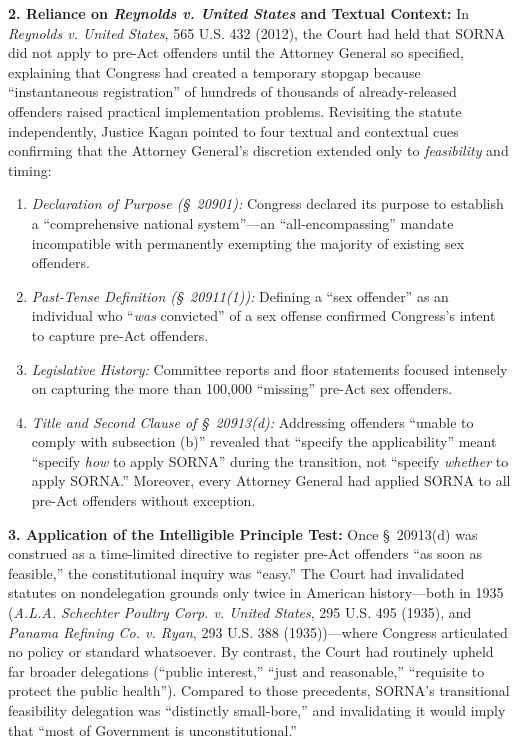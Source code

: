 \documentclass[12pt]{article}
\begin{document}
\textbf{2. Reliance on \textit{Reynolds v. United States} and Textual Context:} In \textit{Reynolds v. United States}, 565 U.S. 432 (2012), the Court had held that SORNA did not apply to pre-Act offenders until the Attorney General so specified, explaining that Congress had created a temporary stopgap because ``instantaneous registration'' of hundreds of thousands of already-released offenders raised practical implementation problems. Revisiting the statute independently, Justice Kagan pointed to four textual and contextual cues confirming that the Attorney General's discretion extended only to \textit{feasibility} and timing:
\begin{enumerate}
  \item \textit{Declaration of Purpose (\S~20901):} Congress declared its purpose to establish a ``comprehensive national system''---an ``all-encompassing'' mandate incompatible with permanently exempting the majority of existing sex offenders.
  \item \textit{Past-Tense Definition (\S~20911(1)):} Defining a ``sex offender'' as an individual who ``\textit{was} convicted'' of a sex offense confirmed Congress's intent to capture pre-Act offenders.
  \item \textit{Legislative History:} Committee reports and floor statements focused intensely on capturing the more than 100,000 ``missing'' pre-Act sex offenders.
  \item \textit{Title and Second Clause of \S~20913(d):} Addressing offenders ``unable to comply with subsection (b)'' revealed that ``specify the applicability'' meant ``specify \textit{how} to apply SORNA'' during the transition, not ``specify \textit{whether} to apply SORNA.'' Moreover, every Attorney General had applied SORNA to all pre-Act offenders without exception.
\end{enumerate}

\textbf{3. Application of the Intelligible Principle Test:} Once \S~20913(d) was construed as a time-limited directive to register pre-Act offenders ``as soon as feasible,'' the constitutional inquiry was ``easy.'' The Court had invalidated statutes on nondelegation grounds only twice in American history---both in 1935 (\textit{A.L.A. Schechter Poultry Corp. v. United States}, 295 U.S. 495 (1935), and \textit{Panama Refining Co. v. Ryan}, 293 U.S. 388 (1935))---where Congress articulated no policy or standard whatsoever. By contrast, the Court had routinely upheld far broader delegations (``public interest,'' ``just and reasonable,'' ``requisite to protect the public health''). Compared to those precedents, SORNA's transitional feasibility delegation was ``distinctly small-bore,'' and invalidating it would imply that ``most of Government is unconstitutional.''
\end{document}
